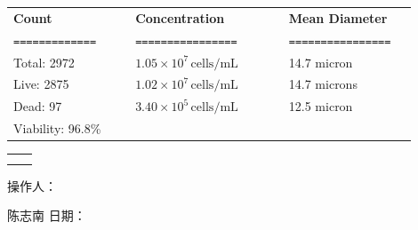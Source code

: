 \documentclass[UTF8,10pt,a4paper,fontset=fandol]{ctexart}
\newcommand{\fieldvalue}[1]{#1}
\newcommand{\handwritten}[1]{#1}
\begin{document}
\begin{tabular}{@{}p{0.27\linewidth}p{0.34\linewidth}p{0.29\linewidth}@{}}
\textbf{Count} & \textbf{Concentration} & \textbf{Mean Diameter} \\
\texttt{=============} & \texttt{================} & \texttt{================} \\[0.2em]

Total:
\fieldvalue{2972}
&
\fieldvalue{$1.05\times10^{7}\,\mathrm{cells/mL}$}
&
\fieldvalue{14.7 micron}
\\

Live:
\fieldvalue{2875}
&
\fieldvalue{$1.02\times10^{7}\,\mathrm{cells/mL}$}
&
\fieldvalue{14.7 microns}
\\

Dead:
\fieldvalue{97}
&
\fieldvalue{$3.40\times10^{5}\,\mathrm{cells/mL}$}
&
\fieldvalue{12.5 micron}
\\

Viability:
\fieldvalue{96.8\%}
& &

\end{tabular}

\vspace{1em}

\noindent
\begin{tabular}{@{}cc@{}}
\fbox{\rule{0pt}{0.24\textheight}\rule{0.43\linewidth}{0pt}}
&
\fbox{\rule{0pt}{0.24\textheight}\rule{0.43\linewidth}{0pt}}
\\[1em]
\fbox{\rule{0pt}{0.24\textheight}\rule{0.43\linewidth}{0pt}}
&
\fbox{\rule{0pt}{0.24\textheight}\rule{0.43\linewidth}{0pt}}
\end{tabular}

\vfill

\noindent
操作人：

\fieldvalue{\handwritten{陈志南}}
\hfill
日期：
\end{document}

